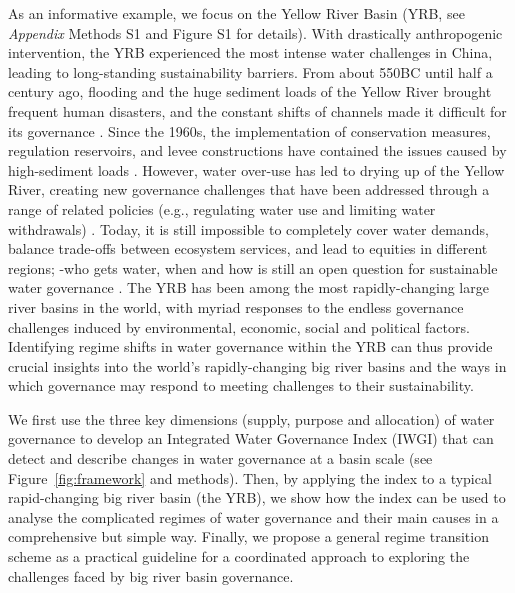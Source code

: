 As an informative example, we focus on the Yellow River Basin (YRB, see \textit{Appendix} Methods S1 and Figure S1 for details).
With drastically anthropogenic intervention, the YRB experienced the most intense water challenges in China, leading to long-standing sustainability barriers.
From about 550BC until half a century ago, flooding and the huge sediment loads of the Yellow River brought frequent human disasters, and the constant shifts of channels made it difficult for its governance
\cite{wangReducedsedimenttransport2016,liDecadalwaterstorage2020}.
Since the 1960s, the implementation of conservation measures, regulation reservoirs, and levee constructions have contained the issues caused by high-sediment loads
\cite{wangReducedsedimenttransport2016,wuEvolutioneffectssocialecological2020}.
However, water over-use has led to drying up of the Yellow River, creating new governance challenges that have been addressed through a range of related policies (e.g., regulating water use and limiting water withdrawals)
\cite{xiaDevelopmentWaterAllocation2012}.
Today, it is still impossible to completely cover water demands, balance trade-offs between ecosystem services, and lead to equities in different regions; -who gets water, when and how is still an open question for sustainable water governance
\cite{wangYellowRiverwater2019,wohlfartSocialecologicalchallengesYellow2016}.
The YRB has been among the most rapidly-changing large river basins in the world, with myriad responses to the endless governance challenges induced by environmental, economic, social and political factors. Identifying regime shifts in water governance within the YRB can thus provide crucial insights into the world’s rapidly-changing big river basins and the ways in which governance may respond to meeting challenges to their sustainability.

We first use the three key dimensions (supply, purpose and allocation) of water governance to develop an Integrated Water Governance Index (IWGI) that can detect and describe changes in water governance at a basin scale (see Figure~\ref{fig:framework} and methods).
Then, by applying the index to a typical rapid-changing big river basin (the YRB), we show how the index can be used to analyse the complicated regimes of water governance and their main causes in a comprehensive but simple way.
Finally, we propose a general regime transition scheme as a practical guideline for a coordinated approach to exploring the challenges faced by big river basin governance.

